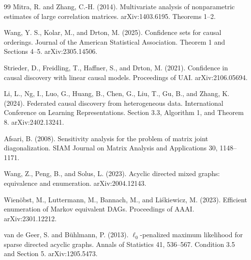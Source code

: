 \documentclass{article}
\begin{document}
\begin{thebibliography}{99}
   Mitra, R. and Zhang, C.-H. (2014). Multivariate analysis of nonparametric estimates of large correlation matrices. arXiv:1403.6195. Theorems 1--2.

   Wang, Y. S., Kolar, M., and Drton, M. (2025). Confidence sets for causal orderings. Journal of the American Statistical Association. Theorem 1 and Sections 4--5. arXiv:2305.14506.

   Strieder, D., Freidling, T., Haffner, S., and Drton, M. (2021). Confidence in causal discovery with linear causal models. Proceedings of UAI. arXiv:2106.05694.

   Li, L., Ng, I., Luo, G., Huang, B., Chen, G., Liu, T., Gu, B., and Zhang, K. (2024). Federated causal discovery from heterogeneous data. International Conference on Learning Representations. Section 3.3, Algorithm 1, and Theorem 8. arXiv:2402.13241.

   Afsari, B. (2008). Sensitivity analysis for the problem of matrix joint diagonalization. SIAM Journal on Matrix Analysis and Applications 30, 1148--1171.

   Wang, Z., Peng, B., and Solus, L. (2023). Acyclic directed mixed graphs: equivalence and enumeration. arXiv:2004.12143.

   Wienöbst, M., Luttermann, M., Bannach, M., and Liśkiewicz, M. (2023). Efficient enumeration of Markov equivalent DAGs. Proceedings of AAAI. arXiv:2301.12212.

   van de Geer, S. and Bühlmann, P. (2013). \(\ell_0\)-penalized maximum likelihood for sparse directed acyclic graphs. Annals of Statistics 41, 536--567. Condition 3.5 and Section 5. arXiv:1205.5473.

\end{thebibliography}
\end{document}
